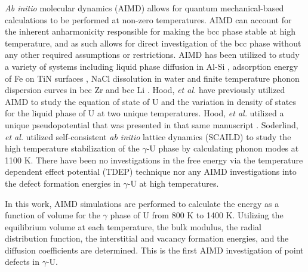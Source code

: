\documentclass[review]{elsarticle}
\begin{document}
\textit{Ab initio} molecular dynamics (AIMD) allows for quantum mechanical-based calculations to be performed at non-zero temperatures. AIMD can account for the inherent anharmonicity responsible for making the bcc phase stable at high temperature, and as such allows for direct investigation of the bcc phase without any other required assumptions or restrictions.  AIMD has been utilized to study a variety of systems including liquid phase diffusion in Al-Si \cite{manga2018}, adsorption energy of Fe on TiN surfaces \cite{wang2010}, NaCl dissolution in water \cite{timko2010} and finite temperature phonon dispersion curves in bcc Zr and bcc Li \cite{hellman2011}. Hood, \textit{et al.} \cite{hood2008} have previously utilized AIMD to study the equation of state of U and the variation in density of states for the liquid phase of U at two unique temperatures. Hood, \textit{et al.} utilized a unique pseudopotential that was presented in that same manuscript \cite{hood2008}. Soderlind, \textit{et al.} \cite{soderlind2012} utilized self-consistent \textit{ab initio} lattice dynamics (SCAILD) to study the high temperature stabilization of the $\gamma$-U phase by calculating phonon modes at 1100 K. There have been no investigations in the free energy via the temperature dependent effect potential (TDEP) technique \cite{hellman2013} nor any AIMD investigations into the defect formation energies in $\gamma$-U at high temperatures. 

In this work, AIMD simulations are performed to calculate the energy as a function of volume for the $\gamma$ phase of U from 800 K to 1400 K. Utilizing the equilibrium volume at each temperature, the bulk modulus, the radial distribution function, the interstitial and vacancy formation energies, and the diffusion coefficients are determined. This is the first AIMD investigation of point defects in $\gamma$-U. 
\end{document}
